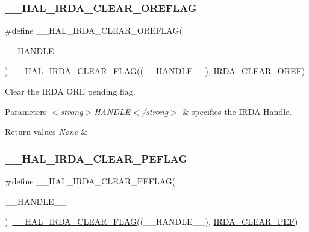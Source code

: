 \subsubsection{\texorpdfstring{\+\_\+\+\_\+\+H\+A\+L\+\_\+\+I\+R\+D\+A\+\_\+\+C\+L\+E\+A\+R\+\_\+\+O\+R\+E\+F\+L\+AG}{\_\_HAL\_IRDA\_CLEAR\_OREFLAG}}
{\footnotesize\ttfamily \#define \+\_\+\+\_\+\+H\+A\+L\+\_\+\+I\+R\+D\+A\+\_\+\+C\+L\+E\+A\+R\+\_\+\+O\+R\+E\+F\+L\+AG(\begin{DoxyParamCaption}\item[{}]{\+\_\+\+\_\+\+H\+A\+N\+D\+L\+E\+\_\+\+\_\+ }\end{DoxyParamCaption})~\hyperlink{group___i_r_d_a___exported___macros_ga4ebf474ecfd858f9320bef9bc67c0bce}{\+\_\+\+\_\+\+H\+A\+L\+\_\+\+I\+R\+D\+A\+\_\+\+C\+L\+E\+A\+R\+\_\+\+F\+L\+AG}((\+\_\+\+\_\+\+H\+A\+N\+D\+L\+E\+\_\+\+\_\+), \hyperlink{group___i_r_d_a___i_t___c_l_e_a_r___flags_gaef356fb07cf820843d8863ee30212a78}{I\+R\+D\+A\+\_\+\+C\+L\+E\+A\+R\+\_\+\+O\+R\+EF})}



Clear the I\+R\+DA O\+RE pending flag. 


\begin{DoxyParams}{Parameters}
{\em $<$strong$>$\+H\+A\+N\+D\+L\+E$<$/strong$>$} & specifies the I\+R\+DA Handle. \\
\hline
\end{DoxyParams}

\begin{DoxyRetVals}{Return values}
{\em None} & \\
\hline
\end{DoxyRetVals}
\mbox{\label{group___i_r_d_a___exported___macros_gae69bd04d655a956dba913c52638de303}} 
\subsubsection{\texorpdfstring{\+\_\+\+\_\+\+H\+A\+L\+\_\+\+I\+R\+D\+A\+\_\+\+C\+L\+E\+A\+R\+\_\+\+P\+E\+F\+L\+AG}{\_\_HAL\_IRDA\_CLEAR\_PEFLAG}}
{\footnotesize\ttfamily \#define \+\_\+\+\_\+\+H\+A\+L\+\_\+\+I\+R\+D\+A\+\_\+\+C\+L\+E\+A\+R\+\_\+\+P\+E\+F\+L\+AG(\begin{DoxyParamCaption}\item[{}]{\+\_\+\+\_\+\+H\+A\+N\+D\+L\+E\+\_\+\+\_\+ }\end{DoxyParamCaption})~\hyperlink{group___i_r_d_a___exported___macros_ga4ebf474ecfd858f9320bef9bc67c0bce}{\+\_\+\+\_\+\+H\+A\+L\+\_\+\+I\+R\+D\+A\+\_\+\+C\+L\+E\+A\+R\+\_\+\+F\+L\+AG}((\+\_\+\+\_\+\+H\+A\+N\+D\+L\+E\+\_\+\+\_\+), \hyperlink{group___i_r_d_a___i_t___c_l_e_a_r___flags_ga1ad61cf6ce6e169e1b7cd9934818bb71}{I\+R\+D\+A\+\_\+\+C\+L\+E\+A\+R\+\_\+\+P\+EF})}



